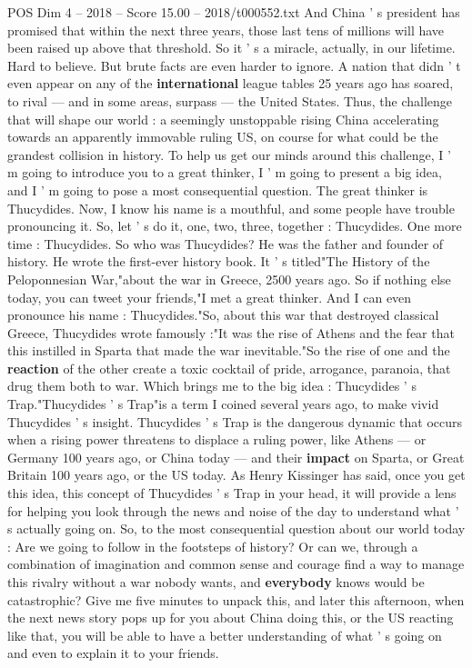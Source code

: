 \begin{textsample}{POS Dim 4 – 2018 – Score 15.00 – 2018/t000552.txt}
And China ' s president has promised that within the next three years, those last tens of millions will have been raised up above that threshold.
So it ' s a miracle, actually, in our lifetime.
Hard to believe.
But brute facts are even harder to ignore.
A nation that didn ' t even appear on any of the \textbf{international} league tables 25 years ago has soared, to rival — and in some areas, surpass — the United States.
Thus, the challenge that will shape our world : a seemingly unstoppable rising China accelerating towards an apparently immovable ruling US, on course for what could be the grandest collision in history.
To help us get our minds around this challenge, I ' m going to introduce you to a great thinker, I ' m going to present a big idea, and I ' m going to pose a most consequential question.
The great thinker is Thucydides.
Now, I know his name is a mouthful, and some people have trouble pronouncing it.
So, let ' s do it, one, two, three, together : Thucydides.
One more time : Thucydides.
So who was Thucydides?
He was the father and founder of history.
He wrote the first-ever history book.
It ' s titled"The History of the Peloponnesian War,"about the war in Greece, 2500 years ago.
So if nothing else today, you can tweet your friends,"I met a great thinker.
And I can even pronounce his name : Thucydides."So, about this war that destroyed classical Greece, Thucydides wrote famously :"It was the rise of Athens and the fear that this instilled in Sparta that made the war inevitable."So the rise of one and the \textbf{reaction} of the other create a toxic cocktail of pride, arrogance, paranoia, that drug them both to war.
Which brings me to the big idea : Thucydides ' s Trap."Thucydides ' s Trap"is a term I coined several years ago, to make vivid Thucydides ' s insight.
Thucydides ' s Trap is the dangerous dynamic that occurs when a rising power threatens to displace a ruling power, like Athens — or Germany 100 years ago, or China today — and their \textbf{impact} on Sparta, or Great Britain 100 years ago, or the US today.
As Henry Kissinger has said, once you get this idea, this concept of Thucydides ' s Trap in your head, it will provide a lens for helping you look through the news and noise of the day to understand what ' s actually going on.
So, to the most consequential question about our world today : Are we going to follow in the footsteps of history?
Or can we, through a combination of imagination and common sense and courage find a way to manage this rivalry without a war nobody wants, and \textbf{everybody} knows would be catastrophic?
Give me five minutes to unpack this, and later this afternoon, when the next news story pops up for you about China doing this, or the US reacting like that, you will be able to have a better understanding of what ' s going on and even to explain it to your friends.

\end{textsample}
